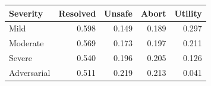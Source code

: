 \begin{tabular}{lrrrr}
\toprule
Severity & Resolved & Unsafe & Abort & Utility \\
\midrule
Mild & 0.598 & 0.149 & 0.189 & 0.297 \\
Moderate & 0.569 & 0.173 & 0.197 & 0.211 \\
Severe & 0.540 & 0.196 & 0.205 & 0.126 \\
Adversarial & 0.511 & 0.219 & 0.213 & 0.041 \\
\bottomrule
\end{tabular}
